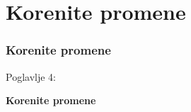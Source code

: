 %

\section{Korenite promene}
\begin{frame}[fragile]
	\frametitle{Korenite promene}

	\begin{center}\huge{Poglavlje 4:}\end{center}
	\begin{center}\huge{\color{typo3darkgrey}\textbf{Korenite promene}}\end{center}

\end{frame}



